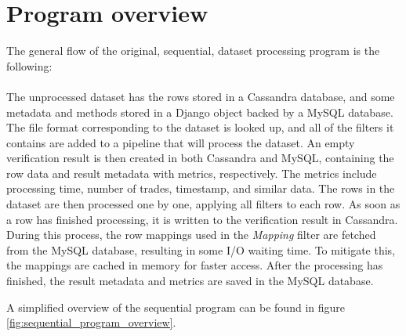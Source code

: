 \section{Program overview}
The general flow of the original, sequential, dataset processing program is the following:
\\\\
The unprocessed dataset has the rows stored in a Cassandra database, and some metadata and methods stored in a Django object backed by a MySQL database.
The file format corresponding to the dataset is looked up, and all of the filters it contains are added to a pipeline that will process the dataset.
An empty verification result is then created in both Cassandra and MySQL, containing the row data and result metadata with metrics, respectively.
The metrics include processing time, number of trades, timestamp, and similar data. The rows in the dataset are then processed one by one,
applying all filters to each row. As soon as a row has finished processing, it is written to the verification result in Cassandra.
During this process, the row mappings used in the \textit{Mapping} filter are fetched from the MySQL database, resulting in some
I/O waiting time. To mitigate this, the mappings are cached in memory for faster access. After the processing has finished, the result metadata
and metrics are saved in the MySQL database.

A simplified overview of the sequential program can be found in figure \ref{fig:sequential_program_overview}.


